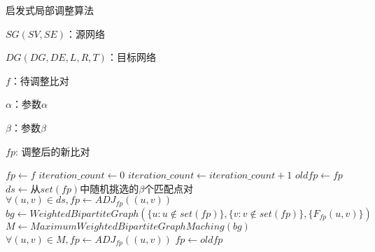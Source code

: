 \begin{small}
\begin{algorithm}[!htb]
{
\caption{启发式局部调整算法}
\label{alg:1}
    \begin{algorithmic}[1]
    \Require
    $SG(SV,SE)$：源网络
    
    $DG(DG,DE,L,R,T)$：目标网络
    
    $f$：待调整比对
    
    $\alpha$：参数$\alpha$
    
    $\beta$：参数$\beta$
    
    \Ensure
    $fp$: 调整后的新比对
    
    \State $fp \gets f$
    \State $iteration\_count \gets 0$
        \State $iteration\_count\gets iteration\_count+1$
        \State $oldfp\gets fp$
        \State $ds\gets$从$set(fp)$中随机挑选的$\beta$个匹配点对
        \State $\forall (u,v)\in ds,fp\gets ADJ_{fp}((u,v))$
        \State $bg\gets WeightedBipartiteGraph(\{u:u\notin set(fp)\},\{v:v\notin set(fp)\},\{F_{fp}(u,v)\})$
        \State $M\gets MaximumWeightedBipartiteGraphMaching(bg)$
        \State $\forall (u,v)\in M,fp\gets ADJ_{fp}((u,v))$
            \State $fp\gets oldfp$
        \EndIf
    \EndWhile
    \end{algorithmic}    
}
\end{algorithm}
\end{small}

